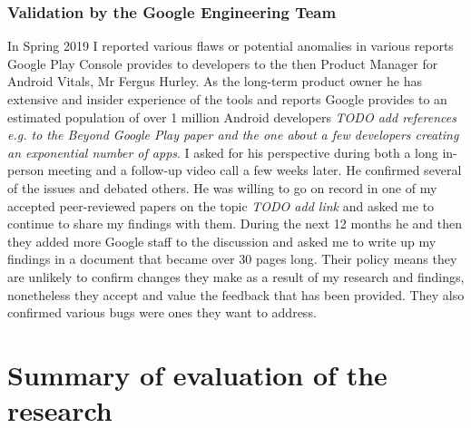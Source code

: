 \subsubsection{Validation by the Google Engineering Team}
In Spring 2019 I reported various flaws or potential anomalies in various reports Google Play Console provides to developers to the then Product Manager for Android Vitals, Mr Fergus Hurley. As the long-term product owner he has extensive and insider experience of the tools and reports Google provides to an estimated population of over 1 million Android developers \emph{TODO add references e.g. to the Beyond Google Play paper and the one about a few developers creating an exponential number of apps}. I asked for his perspective during both a long in-person meeting and a follow-up video call a few weeks later. He confirmed several of the issues and debated others. He was willing to go on record in one of my accepted peer-reviewed papers on the topic \emph{TODO add link} and asked me to continue to share my findings with them. During the next 12 months he and then they added more Google staff to the discussion and asked me to write up my findings in a document that became over 30 pages long. Their policy means they are unlikely to confirm changes they make as a result of my research and findings, nonetheless they accept and value the feedback that has been provided. They also confirmed various bugs were ones they want to address.


\section{Summary of evaluation of the research}

